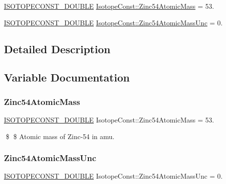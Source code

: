 \begin{DoxyCompactItemize}
\item 
\mbox{\hyperlink{group___isotope_const-_macros_ga8f45a7272ce02c0b4c65c44636ed719a}{I\+S\+O\+T\+O\+P\+E\+C\+O\+N\+S\+T\+\_\+\+D\+O\+U\+B\+LE}} \mbox{\hyperlink{group___isotope_const-_zinc-_zn54_ga27194323be5ee6e275d7ea82704ad34d}{Isotope\+Const\+::\+Zinc54\+Atomic\+Mass}} = 53.
\item 
\mbox{\hyperlink{group___isotope_const-_macros_ga8f45a7272ce02c0b4c65c44636ed719a}{I\+S\+O\+T\+O\+P\+E\+C\+O\+N\+S\+T\+\_\+\+D\+O\+U\+B\+LE}} \mbox{\hyperlink{group___isotope_const-_zinc-_zn54_ga5d782077534ba11e5d29f696eaa04db6}{Isotope\+Const\+::\+Zinc54\+Atomic\+Mass\+Unc}} = 0.
\end{DoxyCompactItemize}


\subsection{Detailed Description}


\subsection{Variable Documentation}
\mbox{\label{group___isotope_const-_zinc-_zn54_ga27194323be5ee6e275d7ea82704ad34d}} 
\subsubsection{\texorpdfstring{Zinc54\+Atomic\+Mass}{Zinc54AtomicMass}}
{\footnotesize\ttfamily \mbox{\hyperlink{group___isotope_const-_macros_ga8f45a7272ce02c0b4c65c44636ed719a}{I\+S\+O\+T\+O\+P\+E\+C\+O\+N\+S\+T\+\_\+\+D\+O\+U\+B\+LE}} Isotope\+Const\+::\+Zinc54\+Atomic\+Mass = 53.}

\$ \$ Atomic mass of Zinc-\/54 in amu. \mbox{\label{group___isotope_const-_zinc-_zn54_ga5d782077534ba11e5d29f696eaa04db6}} 
\subsubsection{\texorpdfstring{Zinc54\+Atomic\+Mass\+Unc}{Zinc54AtomicMassUnc}}
{\footnotesize\ttfamily \mbox{\hyperlink{group___isotope_const-_macros_ga8f45a7272ce02c0b4c65c44636ed719a}{I\+S\+O\+T\+O\+P\+E\+C\+O\+N\+S\+T\+\_\+\+D\+O\+U\+B\+LE}} Isotope\+Const\+::\+Zinc54\+Atomic\+Mass\+Unc = 0.}

